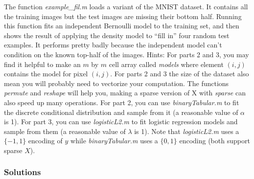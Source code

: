 \documentclass{article}
\begin{document}
The function \emph{example\_fil.m} loads a variant of the MNIST dataset. It contains all the training images but the test images are missing their bottom half. Running this function fits an independent Bernoulli model to the training set, and then shows the result of applying the density model to ``fill in'' four random test examples. It performs pretty badly because the independent model can't condition on the known top-half of the images.
Hints: For parts 2 and 3, you may find it helpful to make an $m$ by $m$ cell array called \emph{models} where element $(i,j)$ contains the model for pixel $(i,j)$. For parts 2 and 3 the size of the dataset also mean you will probably need to vectorize your computation. The functions \emph{permute} and \emph{reshape} will help you, making a sparse version of X with \emph{sparse} can also speed up many operations. For part 2, you can use \emph{binaryTabular.m} to fit the discrete conditional distribution and sample from it (a reasonable value of $\alpha$ is 1). For part 3, you can use \emph{logisticL2.m} to fit logistic regression models and sample from them (a reasonable value of $\lambda$ is 1). Note that \emph{logisticL2.m} uses a $\{-1,1\}$ encoding of $y$ while \emph{binaryTabular.m} uses a $\{0,1\}$ encoding (both support sparse $X$).

\subsubsection*{Solutions}
\end{document}
